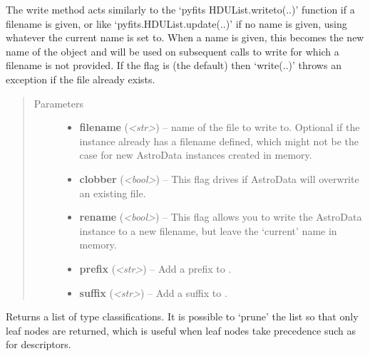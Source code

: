 \documentclass[letterpaper,10pt,english]{sphinxmanual}
\begin{document}
\begin{fulllineitems}
\begin{fulllineitems}
\label{astro_class:astrodata.AstroData.AstroData.write}
The write method acts similarly to the `pyfits HDUList.writeto(..)'
function if a filename is given, or like `pyfits.HDUList.update(..)' if 
no name is given, using whatever the current name is set to. When a name
is given, this becomes the new name of the  object and
will be used on subsequent calls to  write for which a filename is not
provided. If the  flag is  (the default) then 
`write(..)' throws an exception if the file already exists.
\begin{quote}\begin{description}
\item[{Parameters}] \leavevmode\begin{itemize}
\item {} 
\textbf{filename} (\emph{\textless{}str\textgreater{}}) -- name of the file to write to. Optional if the instance
already has a filename defined, which might not be the 
case for new AstroData instances created in memory.

\item {} 
\textbf{clobber} (\emph{\textless{}bool\textgreater{}}) -- This flag drives if AstroData will overwrite an existing
file.

\item {} 
\textbf{rename} (\emph{\textless{}bool\textgreater{}}) -- This flag allows you to write the AstroData instance to
a new filename, but leave the `current' name in memory.

\item {} 
\textbf{prefix} (\emph{\textless{}str\textgreater{}}) -- Add a prefix to .

\item {} 
\textbf{suffix} (\emph{\textless{}str\textgreater{}}) -- Add a suffix to .

\end{itemize}

\end{description}\end{quote}

\end{fulllineitems}


\begin{fulllineitems}
\label{astro_class:astrodata.AstroData.AstroData.type}
Returns a list of type classifications. It is possible to `prune' 
the list so that only leaf nodes are returned, which is 
useful when leaf nodes take precedence such as for descriptors.


\end{fulllineitems}
\end{fulllineitems}
\end{document}
